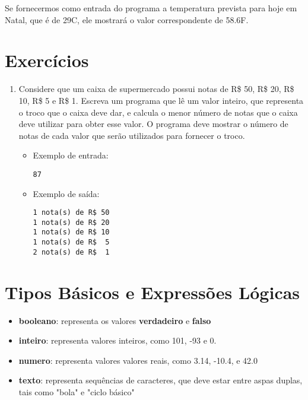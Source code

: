 \documentclass{report}
\begin{document}
Se fornecermos como entrada do programa a temperatura prevista para hoje em Natal,
que é de 29\degree C, ele mostrará o valor correspondente de 58.6\degree F.


\section{Exercícios}

\begin{enumerate}

\item Considere que um caixa de supermercado possui notas de R\$ 50,
R\$ 20, R\$ 10, R\$ 5 e R\$ 1. Escreva um programa que lê um valor
inteiro, que representa o troco que o caixa deve dar, e calcula o
menor número de notas que o caixa deve utilizar para obter esse valor.
O programa deve mostrar o número de notas de cada valor que serão
utilizados para fornecer o troco.
\begin{itemize}
	\item Exemplo de entrada:
\begin{verbatim}
87
\end{verbatim}
	\item Exemplo de saída:
\begin{verbatim}
1 nota(s) de R$ 50
1 nota(s) de R$ 20
1 nota(s) de R$ 10
1 nota(s) de R$  5
2 nota(s) de R$  1
\end{verbatim}
\end{itemize}

\end{enumerate}



\section{Tipos Básicos e Expressões Lógicas}



\begin{itemize}
	\item \textbf{booleano}: representa os valores \textbf{verdadeiro} e \textbf{falso}
	\item \textbf{inteiro}: representa valores inteiros, como 101, -93 e 0.
	\item \textbf{numero}: representa valores valores reais, como 3.14, -10.4, e 42.0
	\item \textbf{texto}: representa sequências de caracteres, que deve estar entre
  aspas duplas, tais como "bola" e "ciclo básico"
\end{itemize}
\end{document}
